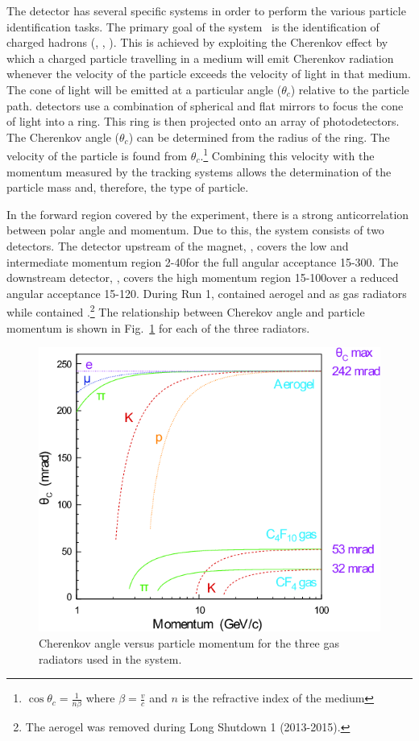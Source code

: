 The \lhcb detector has several specific systems in order to perform the various particle identification tasks. The primary goal of the \rich system~\cite{LHCb-TDR-009,LHCb-DP-2012-003} is the identification of charged hadrons (\pion, \kaon, \proton). This is achieved by exploiting the Cherenkov effect by which a charged particle travelling in a medium will emit Cherenkov radiation whenever the velocity of the particle exceeds the velocity of light in that medium. The cone of light will be emitted at a particular angle ($\theta_{c}$) relative to the particle path. \rich detectors use a combination of spherical and flat mirrors to focus the cone of light into a ring. This ring is then projected onto an array of photodetectors. The Cherenkov angle ($\theta_{c}$) can be determined from the radius of the ring. The velocity of the particle is found from $\theta_{c}$.\footnote{$\cos\theta_{c} = \frac{1}{n\beta}$ where $\beta = \frac{v}{c}$ and $n$ is the refractive index of the medium} Combining this velocity with the momentum measured by the tracking systems allows the determination of the particle mass and, therefore, the type of particle. 

In the forward region covered by the \lhcb experiment, there is a strong anticorrelation between polar angle and momentum. Due to this, the \rich system consists of two detectors. The detector upstream of the magnet, \richone, covers the low and intermediate momentum region 2-40\gevc for the full angular acceptance 15-300\mrad. The downstream detector, \richtwo, covers the high momentum region 15-100\gevc over a reduced angular acceptance 15-120\mrad. During Run 1, \richone contained aerogel and \cfourften as gas radiators while \richtwo contained \cffour.\footnote{The aerogel was removed during Long Shutdown 1 (2013-2015).} The relationship between Cherekov angle and particle momentum is shown in Fig.~\ref{fig:radiators} for each of the three radiators.

\begin{figure}[!tb]
\centering
\includegraphics[height=0.3\textheight]{figs/detector/radiators.png}
\caption{Cherenkov angle versus particle momentum for the three gas radiators used in the \rich system.}
\label{fig:radiators}
\end{figure}

